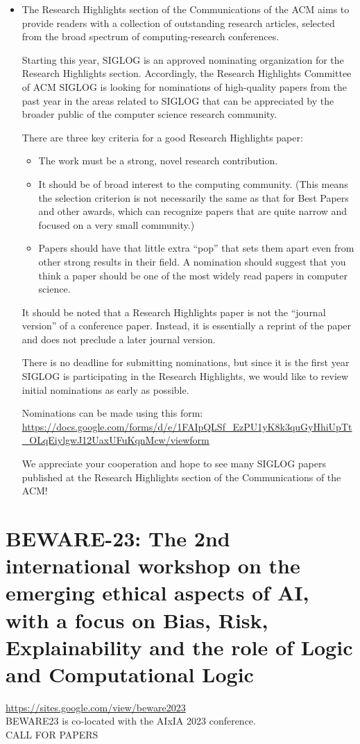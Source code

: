 \documentclass[prodmode,acmtecs]{acmsmall} %
\begin{document}
\begin{itemize}\item  The Research Highlights section of the Communications of the ACM aims to provide readers with a collection of outstanding research articles, selected from the broad spectrum of computing-research conferences.  
 
  Starting this year, SIGLOG is an approved nominating organization for the Research Highlights section. Accordingly, the Research Highlights Committee of ACM SIGLOG is looking for nominations of high-quality papers from the past year in the areas related to SIGLOG that can be appreciated by the broader public of the computer science research community.  
 
  There are three key criteria for a good Research Highlights paper: 
 
\begin{itemize}\item  The work must be a strong, novel research contribution.
\item  It should be of broad interest to the computing community. (This means the selection criterion is not necessarily the same as that for Best Papers and other awards, which can recognize papers that are quite narrow and focused on a very small community.)
\item  Papers should have that little extra “pop” that sets them apart even from other strong results in their field. A nomination should suggest that you think a paper should be one of the most widely read papers in computer science.
\end{itemize} 
  It should be noted that a Research Highlights paper is not the “journal version” of a conference paper. Instead, it is essentially a reprint of the paper and does not preclude a later journal version. 
 
   There is no deadline for submitting nominations, but since it is the first year SIGLOG is participating in the Research Highlights, we would like to review initial nominations as early as possible.  
 
   Nominations can be made using this form: \href{https://docs.google.com/forms/d/e/1FAIpQLSf_EzPU1yK8k3quGyHhiUpTt_OLqEiylgwJ12UaxUFuKqnMcw/viewform}{https://docs.google.com/forms/d/e/1FAIpQLSf\_EzPU1yK8k3quGyHhiUpTt\_OLqEiylgwJ12UaxUFuKqnMcw/viewform} 
 
   We appreciate your cooperation and hope to see many SIGLOG papers published at the Research Highlights section of the Communications of the ACM! 
 
\end{itemize}\section{BEWARE-23: The 2nd international workshop on the emerging ethical aspects of AI, with a focus on Bias, Risk, Explainability and the role of Logic and Computational Logic}\label{BEWARE23}  \href{https://sites.google.com/view/beware2023}{https://sites.google.com/view/beware2023} \\ 
  BEWARE23 is co-located with the AIxIA 2023 conference.\\ 
CALL FOR PAPERS 
\end{document}
